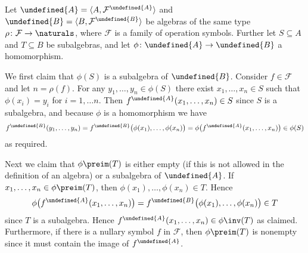 \documentclass[article, a4paper, 11pt, oneside]{memoir}
\let\mathfrak\undefined
\numberwithin{equation}{chapter}
\newcommand{\calF}{\mathcal{F}}
\newcommand{\frakA}{\mathfrak{A}}
\newcommand{\frakB}{\mathfrak{B}}
\theoremstyle{nonumberplain}
\begin{document}
\begin{remarkbreak}
    Let $\frakA = \langle A, \calF^\frakA \rangle$ and $\frakB = \langle B, \calF^\frakB \rangle$ be algebras of the same type $\rho \colon \calF \to \naturals$, where $\calF$ is a family of operation symbols. Further let $S \subseteq A$ and $T \subseteq B$ be subalgebras, and let $\phi \colon \frakA \to \frakB$ a homomorphism.

    We first claim that $\phi(S)$ is a subalgebra of $\frakB$. Consider $f \in \calF$ and let $n = \rho(f)$. For any $y_1, \ldots, y_n \in \phi(S)$ there exist $x_1, \ldots, x_n \in S$ such that $\phi(x_i) = y_i$ for $i = 1, \ldots n$. Then $f^\frakA(x_1, \ldots, x_n) \in S$ since $S$ is a subalgebra, and because $\phi$ is a homomorphism we have
    \begin{equation*}
        f^\frakB(y_1, \ldots, y_n)
            = f^\frakB \bigl( \phi(x_1), \ldots, \phi(x_n) \bigr)
            = \phi \bigl( f^\frakA(x_1, \ldots, x_n) \bigr)
            \in \phi(S)
    \end{equation*}
    as required.

    Next we claim that $\phi\preim(T)$ is either empty (if this is not allowed in the definition of an algebra) or a subalgebra of $\frakA$. If $x_1, \ldots, x_n \in \phi\preim(T)$, then $\phi(x_1), \ldots, \phi(x_n) \in T$. Hence
    \begin{equation*}
        \phi \bigl( f^\frakA(x_1, \ldots, x_n) \bigr)
            = f^\frakB \bigl( \phi(x_1), \ldots, \phi(x_n) \bigr)
            \in T
    \end{equation*}
    since $T$ is a subalgebra. Hence $f^\frakA(x_1, \ldots, x_n) \in \phi\inv(T)$ as claimed. Furthermore, if there is a nullary symbol $f$ in $\calF$, then $\phi\preim(T)$ is nonempty since it must contain the image of $f^\frakA$.
\end{remarkbreak}
\end{document}
